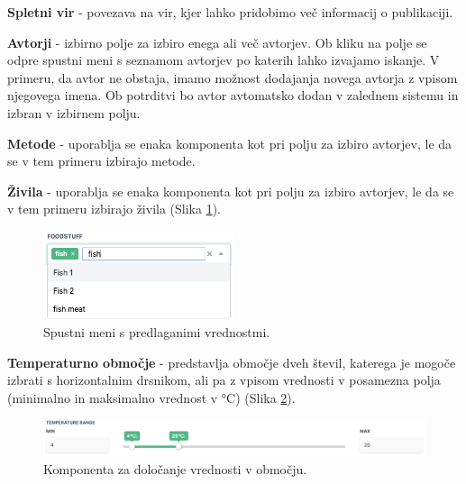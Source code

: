 \documentclass[a4paper, 12pt]{book}
\begin{document}
\begin{description}
\item \textbf{Spletni vir} - povezava na vir, kjer lahko pridobimo več informacij o publikaciji.

\item \textbf{Avtorji} - izbirno polje za izbiro enega ali več avtorjev. Ob kliku na polje se odpre spustni meni s seznamom avtorjev po katerih lahko izvajamo iskanje. V primeru, da avtor ne obstaja, imamo možnost dodajanja novega avtorja z vpisom njegovega imena. Ob potrditvi bo avtor avtomatsko dodan v zalednem sistemu in izbran v izbirnem polju.

\item \textbf{Metode} - uporablja se enaka komponenta kot pri polju za izbiro avtorjev, le da se v tem primeru izbirajo metode.

\item \textbf{Živila} - uporablja se enaka komponenta kot pri polju za izbiro avtorjev, le da se v tem primeru izbirajo živila (Slika \ref{multiselect}).

\begin{figure}[h]
\begin{center}
\includegraphics[width=0.5\textwidth]{slike/multiselect.png}
\end{center}
\caption{ Spustni meni s predlaganimi vrednostmi. }
\label{multiselect}
\end{figure}

\item \textbf{Temperaturno območje} - predstavlja območje dveh števil, katerega je mogoče izbrati s horizontalnim drsnikom, ali pa z vpisom vrednosti v posamezna polja (minimalno in maksimalno vrednost v °C) (Slika  \ref{type-range}).

\begin{figure}[h]
\begin{center}
\includegraphics[width=1\textwidth]{slike/type_range.png}
\end{center}
\caption{ Komponenta za določanje vrednosti v območju. }
\label{type-range}
\end{figure}


\end{description}
\end{document}
